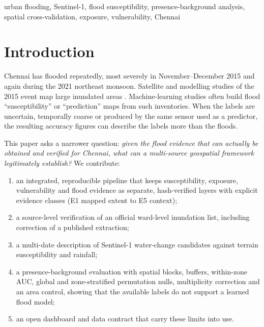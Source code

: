 \documentclass[conference]{IEEEtran}
\begin{document}
\begin{IEEEkeywords}
urban flooding, Sentinel-1, flood susceptibility, presence-background analysis, spatial cross-validation, exposure, vulnerability, Chennai
\end{IEEEkeywords}

\section{Introduction}
Chennai has flooded repeatedly, most severely in November--December 2015 and again during the 2021 northeast monsoon. Satellite and modelling studies of the 2015 event map large inundated areas \cite{ramasamy2018chennai,chundeli2018chennai,iwmi2015chennai}. Machine-learning studies often build flood ``susceptibility'' or ``prediction'' maps from such inventories. When the labels are uncertain, temporally coarse or produced by the same sensor used as a predictor, the resulting accuracy figures can describe the labels more than the floods.

This paper asks a narrower question: \emph{given the flood evidence that can actually be obtained and verified for Chennai, what can a multi-source geospatial framework legitimately establish?} We contribute:
\begin{enumerate}
\item an integrated, reproducible pipeline that keeps susceptibility, exposure, vulnerability and flood evidence as separate, hash-verified layers with explicit evidence classes (E1 mapped extent to E5 context);
\item a source-level verification of an official ward-level inundation list, including correction of a published extraction;
\item a multi-date description of Sentinel-1 water-change candidates against terrain susceptibility and rainfall;
\item a presence-background evaluation with spatial blocks, buffers, within-zone AUC, global and zone-stratified permutation nulls, multiplicity correction and an area control, showing that the available labels do not support a learned flood model;
\item an open dashboard and data contract that carry these limits into use.
\end{enumerate}
\end{document}
